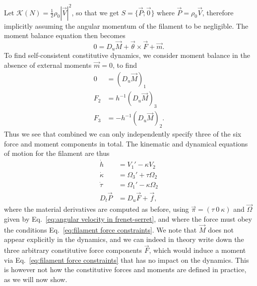Let $\mathcal{K}(N)  = \frac{1}{2} \rho_0 |\vec{V}|^2$, so that we get $S = \{ \vec{P} ; \vec{0} \}$ where $\vec{P} = \rho_0 \vec{V}$, therefore implicitly assuming the angular momentum of the filament to be negligible. The moment balance equation then becomes
\begin{equation} \label{eq:moment balance filament}
0 = D_u \vec{M} + \vec{\theta} \times \vec{F} + \vec{m}.
\end{equation}
To find self-consistent constitutive dynamics, we consider moment balance in the absence of external moments $\vec{m} = 0$, to find
\begin{subequations} \label{eq:filament force constraints}
\begin{align}
0 &  = (D_u \vec{M})_1 \\
F_2 & = h^{-1} (D_u \vec{M})_3 \\
F_3 & = - h^{-1} (D_u \vec{M})_2.
\end{align}
\end{subequations}
Thus we see that combined we can only independently specify three of the six force and moment components in total. The kinematic and dynamical equations of motion for the filament are thus
\begin{subequations} \label{eq:filament dynamic equtions of motion}
\begin{align}
\dot{h} & = V_1' - \kappa V_2 \\
\dot{\kappa} & = \Omega_3' + \tau \Omega_2 \\
\dot{\tau} & = \Omega_1' - \kappa \Omega_2 \\
D_t \vec{P} & = D_u \vec{F} + \vec{f},
\end{align}
\end{subequations}
where the material derivatives are computed as before, using $\vec{\pi} = (\tau\ 0\ \kappa)$ and $\vec{\Omega}$ given by Eq.~\ref{eq:angular velocity in frenet-serret}, and where the force must obey the conditions Eq.~\ref{eq:filament force constraints}. We note that $\vec{M}$ does not appear explicitly in the dynamics, and we can indeed in theory write down the three arbitrary constitutive force components $\vec{F}$, which would induce a moment via Eq.~\ref{eq:filament force constraints} that has no impact on the dynamics. This is however not how the constitutive forces and moments are defined in practice, as we will now show.

